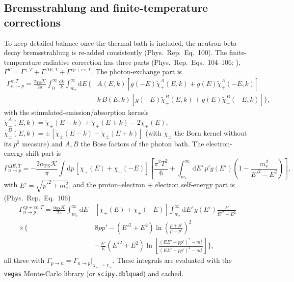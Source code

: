 \documentclass[11pt,a4paper]{article}
\newcommand{\dd}{\mathrm{d}}
\newcommand{\code}[1]{\texttt{#1}}
\newcommand{\PR}{Phys.\ Rep.}
\newcommand{\Kw}{\mathcal{K}}
\newcommand{\afs}{\alpha_{\mathrm{FS}}}
\begin{document}
\subsection*{Bremsstrahlung and finite-temperature corrections}
To keep detailed balance once the thermal bath is included, the
neutron-beta-decay bremsstrahlung is re-added consistently (\PR\ Eq.~100). The
finite-temperature radiative correction has three parts (\PR\ Eqs.~104--106;
\cite{BrownSawyer}),
$\Gamma^{T}=\Gamma^{\gamma,T}+\Gamma^{\Delta E,T}+\Gamma^{ep+ee,T}$. The
photon-exchange part is
\begin{equation}
\begin{aligned}
  \Gamma^{\gamma,T}_{n\to p}=\frac{\afs\Kw}{2\pi}\!\int_0^\infty\!\frac{\dd k}{k}
    \!\int_{m_e}^\infty\!\dd E\,
    \Big\{&A(E,k)\left[g(-E)\tilde\chi^A_+(E,k)+g(E)\tilde\chi^A_+(-E,k)\right]\\
    -\;&k\,B(E,k)\left[g(-E)\tilde\chi^B_+(E,k)+g(E)\tilde\chi^B_+(-E,k)\right]\Big\},
\end{aligned}
\end{equation}
with the stimulated-emission/absorption kernels
$\tilde\chi^A_\pm(E,k)=\tilde\chi_\pm(E-k)+\tilde\chi_\pm(E+k)-2\tilde\chi_\pm(E)$,
$\tilde\chi^B_\pm(E,k)=\pm\left[\tilde\chi_\pm(E-k)-\tilde\chi_\pm(E+k)\right]$
(with $\tilde\chi_\pm$ the Born kernel without its $p^2$ measure) and $A,B$ the
Bose factors of the photon bath. The electron-energy-shift part is
\begin{equation}
  \Gamma^{\Delta E,T}_{n\to p}=-\frac{2\afs\Kw}{\pi}\!\int\!\dd p\,
    \left[\chi_+(E)+\chi_+(-E)\right]
    \left[\frac{\pi^2T^2}{6}+\!\int_{m_e}^\infty\!\dd E'\,p'g(E')
    \left(1-\frac{m_e^2}{E'^2-E^2}\right)\right],
\end{equation}
with $E'=\sqrt{p'^2+m_e^2}$, and the proton--electron + electron self-energy
part is (\PR\ Eq.~106)
\begin{equation}
\begin{aligned}
  \Gamma^{ep+ee,T}_{n\to p}=\frac{\afs\Kw}{2\pi}\!\int_{m_e}^\infty\!\!\dd E\,
    &\left[\chi_+(E)+\chi_+(-E)\right]\!
    \int_{m_e}^\infty\!\!\dd E'\,g(E')\frac{E}{E'^2-E^2}\\
    \times\Big\{&8pp'-(E'^2+E^2)\ln\!\left(\frac{p+p'}{p-p'}\right)^{\!2}\\
    &-\frac{E'}{E}(E'^2+E^2)\ln\!\left[\frac{(EE'+pp')^2-m_e^4}{(EE'-pp')^2-m_e^4}\right]\Big\},
\end{aligned}
\end{equation}
all three with $\Gamma_{p\to n}=\Gamma_{n\to p}|_{\chi_+\to\chi_-}$. These
integrals are evaluated with the \code{vegas} Monte-Carlo library (or
\code{scipy.dblquad}) and cached.
\end{document}
